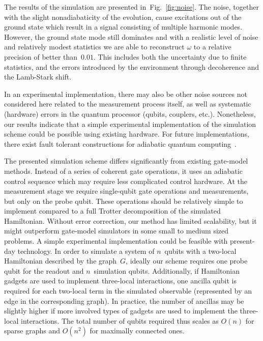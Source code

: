 \documentclass[11pt,oneside,final]{huthesis}%
\begin{document}
The results of the simulation are presented in~Fig.~\ref{fig:noise}.
The noise, together with the slight nonadiabaticity of
the evolution, cause excitations out of the ground state
which result in a signal consisting of multiple harmonic
modes. However, the ground state mode still dominates and with a
realistic level of noise and relatively modest
statistics we are able to
reconstruct $\omega$ to a relative precision of
better than~$0.01$. %
This includes both the uncertainty due to finite statistics, and the
errors introduced by the environment through decoherence and the Lamb-Stark
shift.

In an experimental implementation, there may also be other noise
sources not considered here related to the measurement process itself,
as well as systematic (hardware) errors in the quantum processor
(qubits, couplers, etc.).
Nonetheless, our results indicate that a simple experimental
implementation of the simulation scheme could be possible using
existing hardware.
For future implementations, there exist
fault tolerant constructions for adiabatic quantum
computing~\cite{Jordan06,Lidar08,Amin09C, Bacon09,Crosson10}.



The presented simulation scheme differs significantly from existing
gate-model methods.
Instead of a series of coherent gate operations, it uses
an adiabatic control sequence which may
require less complicated control hardware. 
At the measurement stage we require single-qubit gate operations
and measurements, but only on the probe qubit. These operations should be relatively
simple to implement compared to a full Trotter decomposition of the
simulated Hamiltonian.
Without error correction, our method has limited scalability, but it
might outperform gate-model simulators in some
small to medium sized problems.
A simple experimental implementation could be
feasible with present-day technology.
In order to simulate a system of $n$~qubits with a two-local Hamiltonian
described by the graph~$G$,
ideally our scheme requires 
one probe qubit for the readout and
$n$~simulation qubits.
Additionally, if Hamiltonian gadgets are used to implement three-local
interactions,
one ancilla qubit is required for each two-local term in the
simulated observable (represented by an edge in the
corresponding graph).
In practice, the number of ancillas may be slightly higher if more involved
types of gadgets are used to implement the three-local interactions.
The total number of qubits required thus scales as $O(n)$ for sparse
graphs and $O(n^2)$ for maximally connected ones.
\end{document}
